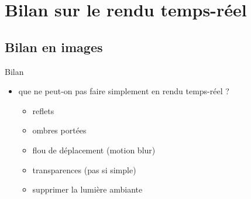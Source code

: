 
\section{Bilan sur le rendu temps-réel}

\subsection{Bilan en images}

\begin{frame}[t]{Bilan}
  \begin{itemize}
    \item que ne peut-on pas faire simplement en rendu temps-réel ?
      \begin{itemize}
        \item reflets
        \item ombres portées
        \item flou de déplacement (motion blur)
        \item transparences (pas si simple)
        \item supprimer la lumière ambiante
      \end{itemize}
  \end{itemize}
\end{frame}

